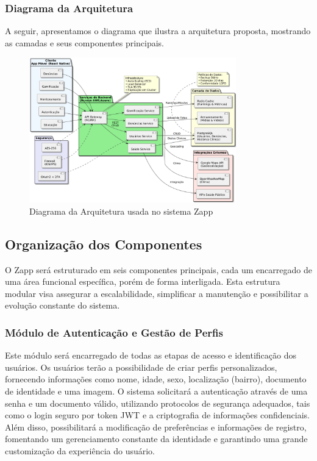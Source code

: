 \documentclass[a4paper, 12pt]{article}
\begin{document}
\subsubsection{Diagrama da Arquitetura}

A seguir, apresentamos o diagrama que ilustra a arquitetura proposta, mostrando as camadas e seus componentes principais.

\begin{figure}[htbp]
    \centering
    \includegraphics[width=0.8\textwidth]{dist/Arquitetura final.png}
    \caption{Diagrama da Arquitetura usada no sistema Zapp}
    \label{fig:arquitetura}
\end{figure}


\subsection{Organização dos Componentes}

O Zapp será estruturado em seis componentes principais, cada um encarregado de uma área funcional específica, porém de forma interligada.  Esta estrutura modular visa assegurar a escalabilidade, simplificar a manutenção e possibilitar a evolução constante do sistema.

\subsubsection{Módulo de Autenticação e Gestão de Perfis}

Este módulo será encarregado de todas as etapas de acesso e identificação dos usuários.  Os usuários terão a possibilidade de criar perfis personalizados, fornecendo informações como nome, idade, sexo, localização (bairro), documento de identidade e uma imagem.  O sistema solicitará a autenticação através de uma senha e um documento válido, utilizando protocolos de segurança adequados, tais como o login seguro por token JWT e a criptografia de informações confidenciais.  Além disso, possibilitará a modificação de preferências e informações de registro, fomentando um gerenciamento constante da identidade e garantindo uma grande customização da experiência do usuário.
\end{document}
